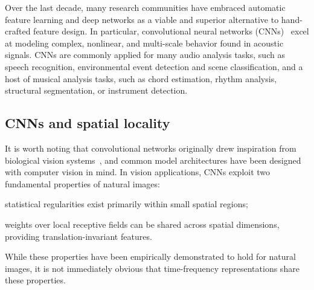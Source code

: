 \documentclass{article}
\begin{document}
Over the last decade, many research communities have embraced automatic feature learning and deep networks as a viable and superior alternative to hand-crafted feature design.
In particular, convolutional neural networks (CNNs)~\cite{lecun1998gradient} excel at modeling complex, nonlinear, and multi-scale behavior found in acoustic signals.
CNNs are commonly applied for many audio analysis tasks, such as speech recognition, environmental event detection and scene classification, and a host of musical analysis tasks, such as chord estimation, rhythm analysis, structural segmentation, or instrument detection.

\subsection{CNNs and spatial locality}
It is worth noting that convolutional networks originally drew inspiration from biological vision systems~\cite{hubel1964effects}, and common model architectures have been designed with computer vision in mind.
In vision applications, CNNs exploit two fundamental properties of natural images:
\begin{enumerate*}
    \item statistical regularities exist primarily within small spatial regions;
    \item weights over local receptive fields can be shared across spatial dimensions, providing translation-invariant features.
\end{enumerate*}
While these properties have been empirically demonstrated to hold for natural images, it is not immediately obvious that time-frequency representations share these properties.
\end{document}
